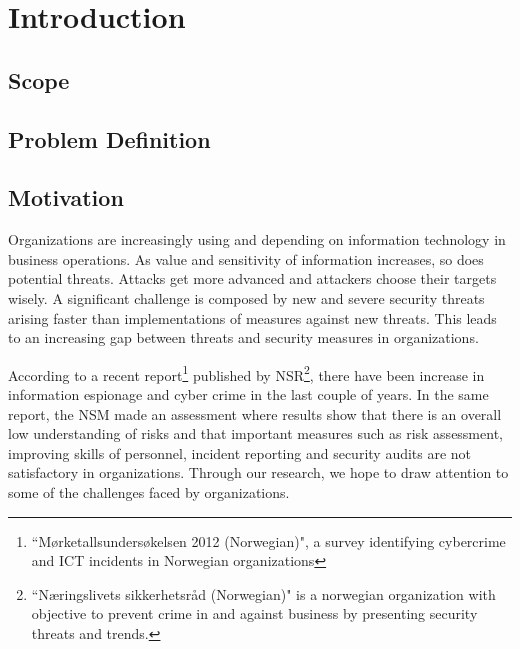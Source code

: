 \chapter{Introduction}
\section{Scope}

\section{Problem Definition}

\section{Motivation}
Organizations are increasingly using and depending on information technology in business operations. As value and sensitivity of information increases, so does potential threats. Attacks get more advanced and attackers choose their targets wisely. A significant challenge is composed by new and severe security threats arising faster than implementations of measures against new threats. This leads to an increasing gap between threats and security measures in organizations.

According to a recent report\footnote{``Mørketallsundersøkelsen 2012 (Norwegian)", a survey identifying cybercrime and ICT incidents in Norwegian organizations} published by NSR\footnote{``Næringslivets sikkerhetsråd (Norwegian)" is a norwegian organization with objective to prevent crime in and against business by presenting security threats and trends.}\cite{Morketall2012}, there have been increase in information espionage and cyber crime in the last couple of years. In the same report, the \ac{NSM} made an assessment where results show that there is an overall low understanding of risks and that important measures such as risk assessment, improving skills of personnel, incident reporting and security audits are not satisfactory in organizations. Through our research, we hope to draw attention to some of the challenges faced by organizations. 





